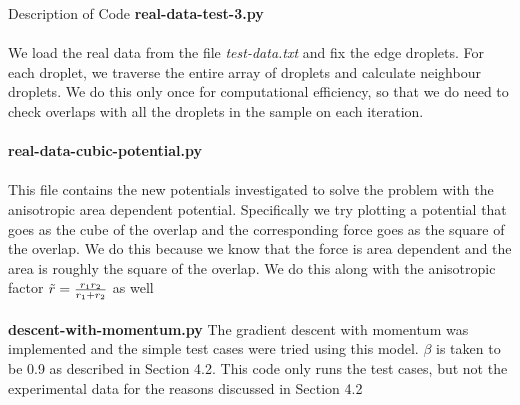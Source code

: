 \documentclass[12pt]{article}
\begin{document}
\begin{section}{Description of Code}
\textbf{real-data-test-3.py}\\\\
We load the real data from the file \textit{test-data.txt} and fix the edge droplets. For each droplet, we traverse the entire array of droplets and calculate neighbour droplets. We do this only once for computational efficiency, so that we do need to check overlaps with all the droplets in the sample on each iteration.\\\\
\textbf{real-data-cubic-potential.py}\\\\
This file contains the new potentials investigated to solve the problem with the anisotropic area dependent potential. Specifically we try plotting a potential that goes as the cube of the overlap and the corresponding force goes as the square of the overlap. We do this because we know that the force is area dependent and the area is roughly the square of the overlap. We do this along with the anisotropic factor $\Tilde{r} = \frac{r_1 r_2}{r_1 + r_2}$ as well\\\\
\textbf{descent-with-momentum.py}
The gradient descent with momentum was implemented and the simple test cases were tried using this model. $\beta$ is taken to be 0.9 as described in Section 4.2. This code only runs the test cases, but not the experimental data for the reasons discussed in Section 4.2
\end{section}
\end{document}
